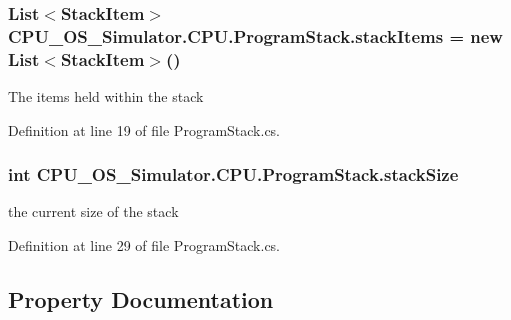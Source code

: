 \subsubsection[{stack\+Items}]{\setlength{\rightskip}{0pt plus 5cm}List$<${\bf Stack\+Item}$>$ C\+P\+U\+\_\+\+O\+S\+\_\+\+Simulator.\+C\+P\+U.\+Program\+Stack.\+stack\+Items = new List$<${\bf Stack\+Item}$>$()\hspace{0.3cm}{\ttfamily [private]}}\label{class_c_p_u___o_s___simulator_1_1_c_p_u_1_1_program_stack_ada087487ee69e4e38e2f2591bdc28f37}


The items held within the stack 



Definition at line 19 of file Program\+Stack.\+cs.

\hypertarget{class_c_p_u___o_s___simulator_1_1_c_p_u_1_1_program_stack_ab0667a30e4d6e10c3ffddfdfbc084102}{}
\subsubsection[{stack\+Size}]{\setlength{\rightskip}{0pt plus 5cm}int C\+P\+U\+\_\+\+O\+S\+\_\+\+Simulator.\+C\+P\+U.\+Program\+Stack.\+stack\+Size\hspace{0.3cm}{\ttfamily [private]}}\label{class_c_p_u___o_s___simulator_1_1_c_p_u_1_1_program_stack_ab0667a30e4d6e10c3ffddfdfbc084102}


the current size of the stack 



Definition at line 29 of file Program\+Stack.\+cs.



\subsection{Property Documentation}
\hypertarget{class_c_p_u___o_s___simulator_1_1_c_p_u_1_1_program_stack_a5ed770e83658cfcde6e451c27342dca3}{}
